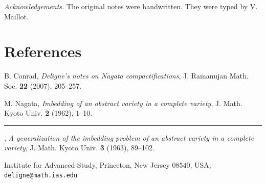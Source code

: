 \documentclass[10pt,a4paper]{article}
\theoremstyle{deligne}
\begin{document}
\textit{Acknowledgements.} The original notes were handwritten. They were typed by V. Maillot.

\section*{References}
\begin{enumerate}[label={[\arabic*]},leftmargin=2.8em]
\item B. Conrad, \textit{Deligne's notes on Nagata compactifications}, J. Ramanujan Math. Soc. \textbf{22} (2007), 205--257.
\item M. Nagata, \textit{Imbedding of an abstract variety in a complete variety}, J. Math. Kyoto Univ. \textbf{2} (1962), 1--10.
\item \rule{2.5em}{0.4pt}, \textit{A generalization of the imbedding problem of an abstract variety in a complete variety}, J. Math. Kyoto Univ. \textbf{3} (1963), 89--102.
\end{enumerate}

Institute for Advanced Study, Princeton, New Jersey 08540, USA;\\
\texttt{deligne@math.ias.edu}
\end{document}
